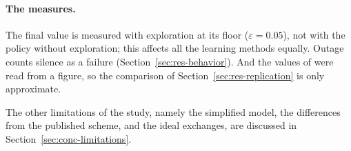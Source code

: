 \paragraph{The measures.} The final value is measured with exploration at its floor ($\varepsilon = 0.05$),
not with the policy without exploration; this affects all the learning methods equally. Outage counts
silence as a failure (Section~\ref{sec:res-behavior}). And the values of \citet{li+22fedmarl} were read from a
figure, so the comparison of Section~\ref{sec:res-replication} is only approximate.

The other limitations of the study, namely the simplified model, the differences from the published scheme,
and the ideal exchanges, are discussed in Section~\ref{sec:conc-limitations}.
